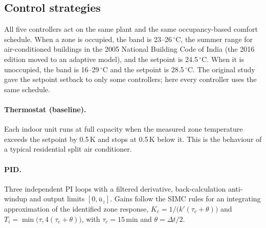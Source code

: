 \subsection{Control strategies}
All five controllers act on the same plant and the same occupancy-based comfort
schedule. When a zone is occupied, the band is 23--26\,$^\circ$C, the summer range for
air-conditioned buildings in the 2005 National Building Code of India \cite{nbc2005}
(the 2016 edition moved to an adaptive model), and the setpoint is 24.5\,$^\circ$C. When it is unoccupied, the band is 16--29\,$^\circ$C and
the setpoint is 28.5\,$^\circ$C. The original study gave the setpoint setback to only
some controllers; here every controller uses the same schedule.

\paragraph{Thermostat (baseline).}
Each indoor unit runs at full capacity when the measured zone temperature exceeds the
setpoint by 0.5\,K and stops at 0.5\,K below it. This is the behaviour of a typical
residential split air conditioner.

\paragraph{PID.}
Three independent PI loops with a filtered derivative, back-calculation anti-windup and
output limits $[0,\bar u_z]$. Gains follow the SIMC rules
\cite{skogestad2003} for an integrating approximation of the identified zone response,
$K_c=1/\big(k'(\tau_c+\theta)\big)$ and $T_i=\min\big(\tau,4(\tau_c+\theta)\big)$, with
$\tau_c=15$\,min and $\theta=\Delta t/2$.

